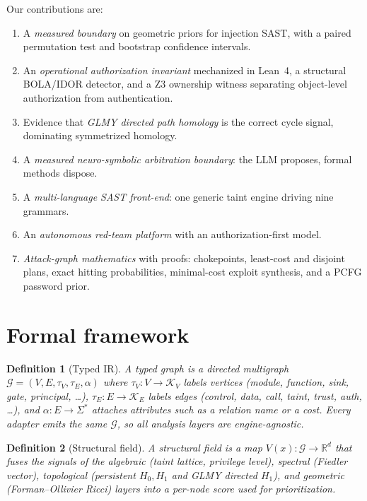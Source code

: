 \documentclass[journal]{IEEEtran}
\newcommand{\R}{\mathbb{R}}
\newcommand{\IR}{\mathcal{G}}
\newtheorem{definition}{Definition}
\begin{document}
Our contributions are:
\begin{enumerate}[label=\textbf{C\arabic*.},leftmargin=2.2em]
\item A \emph{measured boundary} on geometric priors for injection SAST, with a
  paired permutation test and bootstrap confidence intervals.
\item An \emph{operational authorization invariant} mechanized in Lean~4, a
  structural BOLA/IDOR detector, and a Z3 ownership witness separating
  object-level authorization from authentication.
\item Evidence that \emph{GLMY directed path homology} is the correct cycle
  signal, dominating symmetrized homology.
\item A \emph{measured neuro-symbolic arbitration boundary}: the LLM proposes,
  formal methods dispose.
\item A \emph{multi-language SAST front-end}: one generic taint engine driving
  nine grammars.
\item An \emph{autonomous red-team platform} with an authorization-first model.
\item \emph{Attack-graph mathematics} with proofs: chokepoints, least-cost and
  disjoint plans, exact hitting probabilities, minimal-cost exploit synthesis,
  and a PCFG password prior.
\end{enumerate}

\section{Formal framework}
\label{sec:framework}

\begin{definition}[Typed IR]
\label{def:ir}
A \emph{typed graph} is a directed multigraph $\IR=(V,E,\tau_V,\tau_E,\alpha)$
where $\tau_V:V\to\mathcal{K}_V$ labels vertices (module, function, sink, gate,
principal, \dots), $\tau_E:E\to\mathcal{K}_E$ labels edges (control, data, call,
taint, trust, auth, \dots), and $\alpha:E\to\Sigma^{*}$ attaches attributes such
as a relation name or a cost. Every adapter emits the same $\IR$, so all analysis
layers are engine-agnostic.
\end{definition}

\begin{definition}[Structural field]
\label{def:field}
A \emph{structural field} is a map $V(x):\IR\to\R^{d}$ that fuses the signals of
the algebraic (taint lattice, privilege level), spectral (Fiedler vector),
topological (persistent $H_0,H_1$ and GLMY directed $H_1$), and geometric
(Forman--Ollivier Ricci) layers into a per-node score used for prioritization.
\end{definition}
\end{document}
